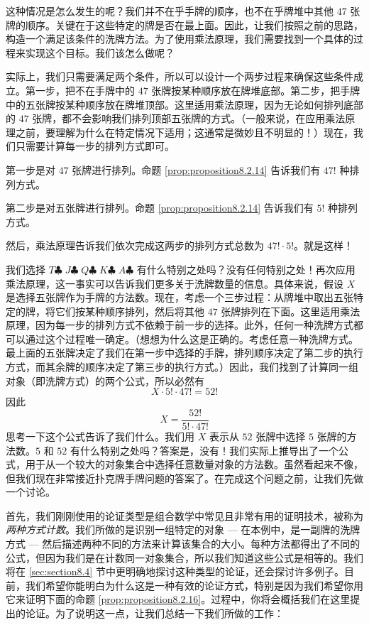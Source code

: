 这种情况是怎么发生的呢？我们并不在乎手牌的顺序，也不在乎牌堆中其他 $47$ 张牌的顺序。关键在于这些特定的牌是否在最上面。因此，让我们按照之前的思路，构造一个满足该条件的洗牌方法。为了使用乘法原理，我们需要找到一个具体的过程来实现这个目标。我们该怎么做呢？

实际上，我们只需要满足两个条件，所以可以设计一个两步过程来确保这些条件成立。第一步，把不在手牌中的 $47$ 张牌按某种顺序放在牌堆底部。第二步，把手牌中的五张牌按某种顺序放在牌堆顶部。这里适用乘法原理，因为无论如何排列底部的 $47$ 张牌，都不会影响我们排列顶部五张牌的方式。（一般来说，在应用乘法原理之前，要理解为什么在特定情况下适用；这通常是微妙且不明显的！）现在，我们只需要计算每一步的排列方式即可。

第一步是对 $47$ 张牌进行排列。命题 \ref{prop:proposition8.2.14} 告诉我们有 $47!$ 种排列方式。

第二步是对五张牌进行排列。命题 \ref{prop:proposition8.2.14} 告诉我们有 $5!$ 种排列方式。

然后，乘法原理告诉我们依次完成这两步的排列方式总数为 $47! \cdot 5!$。就是这样！

我们选择 $T\clubsuit\; J\clubsuit\; Q\clubsuit\; K\clubsuit\; A\clubsuit$ 有什么特别之处吗？没有任何特别之处！再次应用乘法原理，这一事实可以告诉我们更多关于洗牌数量的信息。具体来说，假设 $X$ 是选择五张牌作为手牌的方法数。现在，考虑一个三步过程：从牌堆中取出五张特定的牌，将它们按某种顺序排列，然后将其他 $47$ 张牌排列在下面。这里适用乘法原理，因为每一步的排列方式不依赖于前一步的选择。此外，任何一种洗牌方式都可以通过这个过程唯一确定。（想想为什么这是正确的。考虑任意一种洗牌方式。最上面的五张牌决定了我们在第一步中选择的手牌，排列顺序决定了第二步的执行方式，而其余牌的顺序决定了第三步的执行方式。）因此，我们找到了计算同一组对象（即洗牌方式）的两个公式，所以必然有
\[X \cdot 5! \cdot 47! = 52!\]
因此
\[X = \frac{52!}{5! \cdot 47!}\]
思考一下这个公式告诉了我们什么。我们用 $X$ 表示从 $52$ 张牌中选择 $5$ 张牌的方法数。$5$ 和 $52$ 有什么特别之处吗？答案是，没有！我们实际上推导出了一个公式，用于从一个较大的对象集合中选择任意数量对象的方法数。虽然看起来不像，但我们现在非常接近扑克牌手牌问题的答案了。在完成这个问题之前，让我们先做一个讨论。

首先，我们刚刚使用的论证类型是组合数学中常见且非常有用的证明技术，被称为\emph{两种方式计数}。我们所做的是识别一组特定的对象 --- 在本例中，是一副牌的洗牌方式 --- 然后描述两种不同的方法来计算该集合的大小。每种方法都得出了不同的公式，但因为我们是在计数同一对象集合，所以我们知道这些公式是相等的。我们将在 \ref{sec:section8.4} 节中更明确地探讨这种类型的论证，还会探讨许多例子。目前，我们希望你能明白为什么这是一种有效的论证方式，特别是因为我们希望你用它来证明下面的命题 \ref{prop:proposition8.2.16}。过程中，你将会概括我们在这里提出的论证。为了说明这一点，让我们总结一下我们所做的工作：

